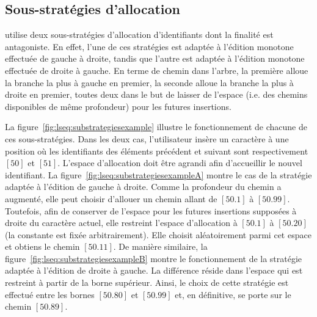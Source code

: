 \subsection{Sous-stratégies d'allocation}

\LSEQ utilise deux sous-stratégies d'allocation d'identifiants dont la finalité
est antagoniste. En effet, l'une de ces stratégies est adaptée à l'édition
monotone effectuée de gauche à droite, tandis que l'autre est adaptée à
l'édition monotone effectuée de droite à gauche. En terme de chemin dans
l'arbre, la première alloue la branche la plus à gauche en premier, la seconde
alloue la branche la plus à droite en premier, toutes deux dans le but de
laisser de l'espace (i.e. des chemins disponibles de même profondeur) pour les
futures insertions.

\begin{figure*}
  \centering
  \hspace{20pt}
  \caption{\label{fig:lseq:substrategiesexample}Les sous-stratégies employées
    par \LSEQ.}
\end{figure*}

La figure~\ref{fig:lseq:substrategiesexample} illustre le fonctionnement de
chacune de ces sous-stratégies. Dans les deux cas, l'utilisateur insère un
caractère à une position où les identifiants des éléments précédent et suivant
sont respectivement $[50]$ et $[51]$. L'espace d'allocation doit être agrandi
afin d'accueillir le nouvel identifiant. La
figure~\ref{fig:lseq:substrategiesexampleA} montre le cas de la stratégie
adaptée à l'édition de gauche à droite. Comme la profondeur du chemin a
augmenté, elle peut choisir d'allouer un chemin allant de $[50.1]$ à
$[50.99]$. Toutefois, afin de conserver de l'espace pour les futures insertions
supposées à droite du caractère actuel, elle restreint l'espace d'allocation à
$[50.1]$ à $[50.20]$ (la constante est fixée arbitrairement). Elle choisit
aléatoirement parmi cet espace et obtiens le chemin $[50.11]$. De manière
similaire, la figure~\ref{fig:lseq:substrategiesexampleB} montre le
fonctionnement de la stratégie adaptée à l'édition de droite à gauche. La
différence réside dans l'espace qui est restreint à partir de la borne
supérieur.  Ainsi, le choix de cette stratégie est effectué entre les bornes
$[50.80]$ et $[50.99]$ et, en définitive, se porte sur le chemin $[50.89]$.

